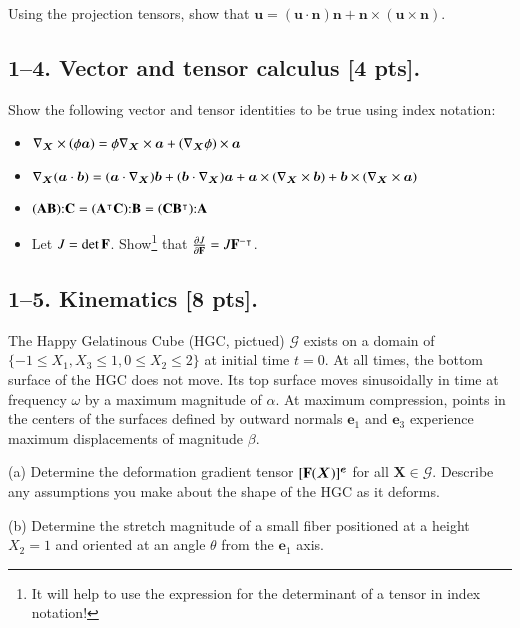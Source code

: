 Using the projection tensors, show that $\bm{u} = (\bm{u} \cdot \bm{n}) \bm{n} + \bm{n} \times (\bm{u} \times \bm{n} )$.

\bigskip
\subsection*{1--4. \textbf{Vector and tensor calculus} [4 pts].} Show the following vector and tensor identities to be true using index notation:

\begin{itemize}
    \item $\nabla_{\bm{X}} \times (\phi \bm{a}) = \phi \nabla_{\bm{X}} \times \bm{a} + (\nabla_{\bm{X}}\phi) \times \bm{a}$
    \item $\nabla_{\bm{X}} (\bm{a} \cdot \bm{b}) = (\bm{a} \cdot \nabla_{\bm{X}}) \bm{b} + (\bm{b} \cdot \nabla_{\bm{X}}) \bm{a} + \bm{a} \times (\nabla_{\bm{X}} \times \bm{b}) + \bm{b} \times (\nabla_{\bm{X}} \times \bm{a})$
    \item $ (\mathbf{A} \mathbf{B}) \mathbf{:} \mathbf{C} = (\mathbf{A}^\intercal \mathbf{C})\mathbf{:} \mathbf{B} = (\mathbf{C} \mathbf{B}^\intercal)\mathbf{:} \mathbf{A}$
    \item Let $J = \det \mathbf{F}$. Show\footnote{It will help to use the expression for the determinant of a tensor in index notation!} that $\frac{\partial J}{\partial \mathbf{F}} = J \mathbf{F}^{-\intercal}$. 
    \end{itemize}

\bigskip
\subsection*{1--5. \textbf{Kinematics} [8 pts].} The Happy Gelatinous Cube (HGC, pictued) $\mathcal{G}$ exists on a domain of $\{-1\leq X_1 , X_3\leq1, 0\leq X_2 \leq 2\}$ at initial time $t=0$. 
At all times, the bottom surface of the HGC does not move. 
Its top surface moves sinusoidally in time at frequency $\omega$ by a maximum magnitude of $\alpha$. 
At maximum compression, points in the centers of the surfaces defined by outward normals $\bm{e}_1$ and $\bm{e}_3$ experience maximum displacements of magnitude $\beta$. 

\medskip
(a) Determine the deformation gradient tensor $[\mathbf{F}(\bm{X})]^{\bm{e}}$ for all $\bm{X}\in \mathcal{G}$. 
Describe any assumptions you make about the shape of the HGC as it deforms. 

\medskip
(b) Determine the stretch magnitude of a small fiber positioned at a height $X_2 = 1$ and oriented at an angle $\theta$ from the $\bm{e}_1$ axis. 


